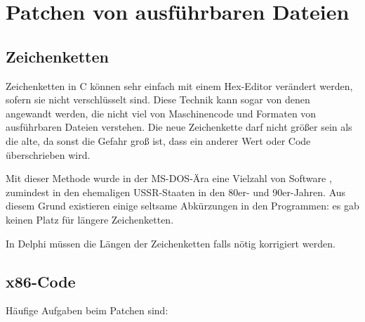 \section{Patchen von ausführbaren Dateien}

\subsection{Zeichenketten}

Zeichenketten in C können sehr einfach mit einem Hex-Editor verändert werden,
sofern sie nicht verschlüsselt sind.
Diese Technik kann sogar von denen angewandt werden, die nicht viel von Maschinencode
und Formaten von ausführbaren Dateien verstehen.
Die neue Zeichenkette darf nicht größer sein als die alte, da sonst die Gefahr
groß ist, dass ein anderer Wert oder Code überschrieben wird.

Mit dieser Methode wurde in der MS-DOS-Ära eine Vielzahl von Software ,
zumindest in den ehemaligen USSR-Staaten in den 80er- und 90er-Jahren.
Aus diesem Grund existieren einige seltsame Abkürzungen in den 
Programmen: es gab keinen Platz für längere Zeichenketten.


In Delphi müssen die Längen der Zeichenketten falls nötig korrigiert werden.

\subsection{x86-Code}
\label{x86_patching}

Häufige Aufgaben beim Patchen sind:

